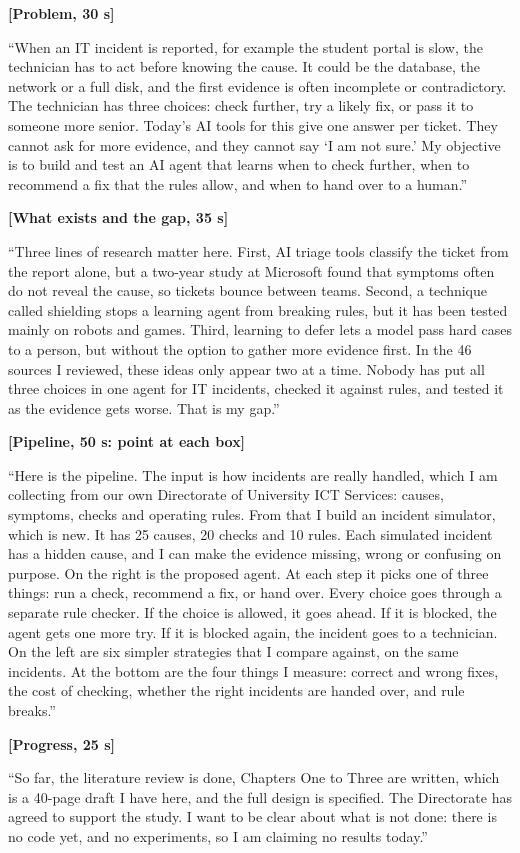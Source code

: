 \documentclass[10pt,a4paper]{article}
\newcommand{\say}[1]{\par\colorbox{soft}{\parbox{\dimexpr\linewidth-2\fboxsep}{#1}}\par}
\newcommand{\tm}[1]{\textbf{\color{accent}[#1]}}
\begin{document}
\tm{Problem, 30 s}
\say{``When an IT incident is reported, for example the student portal is slow, the technician has to act before knowing the cause. It could be the database, the network or a full disk, and the first evidence is often incomplete or contradictory. The technician has three choices: check further, try a likely fix, or pass it to someone more senior. Today's AI tools for this give one answer per ticket. They cannot ask for more evidence, and they cannot say `I am not sure.' My objective is to build and test an AI agent that learns when to check further, when to recommend a fix that the rules allow, and when to hand over to a human.''}

\tm{What exists and the gap, 35 s}
\say{``Three lines of research matter here. First, AI triage tools classify the ticket from the report alone, but a two-year study at Microsoft found that symptoms often do not reveal the cause, so tickets bounce between teams. Second, a technique called shielding stops a learning agent from breaking rules, but it has been tested mainly on robots and games. Third, learning to defer lets a model pass hard cases to a person, but without the option to gather more evidence first. In the 46 sources I reviewed, these ideas only appear two at a time. Nobody has put all three choices in one agent for IT incidents, checked it against rules, and tested it as the evidence gets worse. That is my gap.''}

\tm{Pipeline, 50 s: point at each box}
\say{``Here is the pipeline. The input is how incidents are really handled, which I am collecting from our own Directorate of University ICT Services: causes, symptoms, checks and operating rules. From that I build an incident simulator, which is new. It has 25 causes, 20 checks and 10 rules. Each simulated incident has a hidden cause, and I can make the evidence missing, wrong or confusing on purpose. On the right is the proposed agent. At each step it picks one of three things: run a check, recommend a fix, or hand over. Every choice goes through a separate rule checker. If the choice is allowed, it goes ahead. If it is blocked, the agent gets one more try. If it is blocked again, the incident goes to a technician. On the left are six simpler strategies that I compare against, on the same incidents. At the bottom are the four things I measure: correct and wrong fixes, the cost of checking, whether the right incidents are handed over, and rule breaks.''}

\tm{Progress, 25 s}
\say{``So far, the literature review is done, Chapters One to Three are written, which is a 40-page draft I have here, and the full design is specified. The Directorate has agreed to support the study. I want to be clear about what is not done: there is no code yet, and no experiments, so I am claiming no results today.''}
\end{document}
